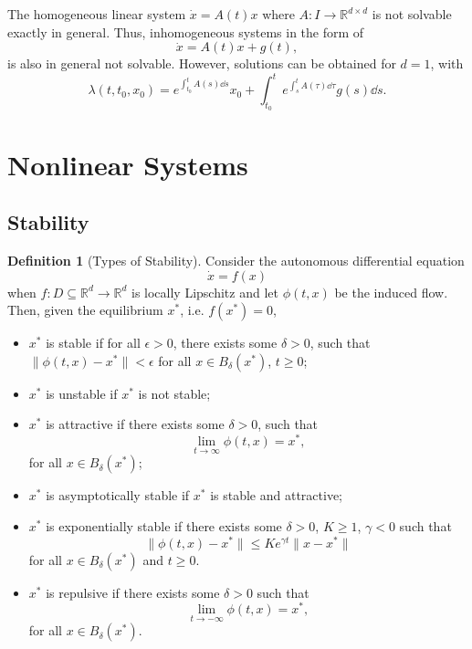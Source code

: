\documentclass[
]{article}
\theoremstyle{definition}
\theoremstyle{definition}
\newtheorem{definition}{Definition}[section]
\begin{document}
The homogeneous linear system \(\dot x = A(t)x\) where
\(A : I \to \mathbb{R}^{d \times d}\) is not solvable exactly in
general. Thus, inhomogeneous systems in the form of
\[\dot x = A(t)x + g(t),\] is also in general not solvable. However,
solutions can be obtained for \(d = 1\), with
\[\lambda(t, t_0, x_0) = e^{\int_{t_0}^t A(s) \dd s} x_0 + 
  \int_{t_0}^t e^{\int_s^t A(\tau) \dd \tau} g(s)\dd s.\]

\newpage

\hypertarget{nonlinear-systems}{%
\section{Nonlinear Systems}\label{nonlinear-systems}}

\hypertarget{stability}{%
\subsection{Stability}\label{stability}}

\begin{definition}[Types of Stability]
  Consider the autonomous differential equation 
  \[\dot x = f(x)\]
  when \(f : D \subseteq \mathbb{R}^d \to \mathbb{R}^d\) is locally Lipschitz and 
  let \(\phi(t, x)\) be the induced flow. Then, given the equilibrium \(x^*\), i.e.
  \(f(x^*) = 0\), 
  \begin{itemize}
    \item \(x^*\) is stable if for all \(\epsilon > 0\), there exists some \(\delta > 0\), 
      such that \(\|\phi(t, x) - x^*\| < \epsilon\) for all \(x \in B_\delta(x^*)\), 
      \(t \ge 0\);
    \item \(x^*\) is unstable if \(x^*\) is not stable;
    \item \(x^*\) is attractive if there exists some \(\delta > 0\), such that 
      \[\lim_{t \to \infty} \phi(t, x) = x^*,\]
      for all \(x \in B_\delta(x^*)\);
    \item \(x^*\) is asymptotically stable if \(x^*\) is stable and attractive;
    \item \(x^*\) is exponentially stable if there exists some \(\delta > 0\), 
      \(K \ge 1\), \(\gamma < 0\) such that 
        \[\| \phi(t, x) - x^*\| \le Ke^{\gamma t}\|x - x^*\|\]
      for all \(x \in B_\delta(x^*)\) and \(t \ge 0\).
    \item \(x^*\) is repulsive if there exists some \(\delta > 0\) such that 
      \[\lim_{t \to -\infty} \phi(t, x) = x^*,\]
      for all \(x \in B_\delta(x^*)\).
  \end{itemize}
\end{definition}
\end{document}
